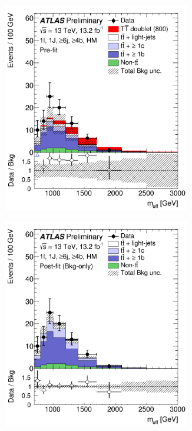 \begin{figure}[p!]
\begin{subfigure}{0.24\textwidth}
  \caption{}
  \label{}
\end{subfigure}
\begin{subfigure}{0.24\textwidth}
  \centering
  \includegraphics[width=0.9\textwidth]{figures/VLQ/fig_11a.png}
  \caption{}
  \label{}
\end{subfigure}
\begin{subfigure}{0.24\textwidth}
  \centering
  \includegraphics[width=0.9\textwidth]{figures/VLQ/fig_11b.png}

\end{subfigure}
\end{figure}
